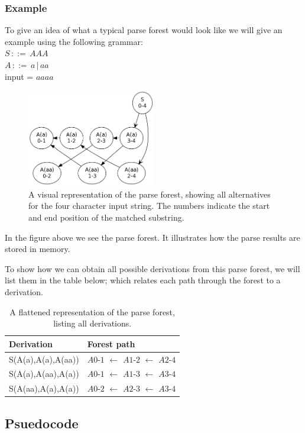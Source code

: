 \documentclass[a4paper,10pt]{article}
\begin{document}
\pagebreak
\subsubsection{Example}
To give an idea of what a typical parse forest would look like we will give an example using the following grammar:\\
$S\,::=\,AAA$\\
$A\,::=\,a\,|\,aa$\\
input = $aaaa$

\begin{figure}[H]
\centering
\includegraphics[width=0.5\textwidth]{a_aa-forest.png}
\caption{A visual representation of the parse forest, showing all alternatives for the four character input string. The numbers indicate the start and end position of the matched substring.}
\end{figure}

In the figure above we see the parse forest. It illustrates how the parse results are stored in memory.

To show how we can obtain all possible derivations from this parse forest, we will list them in the table below; which relates each path through the forest to a derivation.

\begin{table}[H]
\centering
\begin{tabular}{ p{15em} p{15em} }
Derivation & Forest path\\
\hline
S(A(a),A(a),A(aa)) & $A0$-$1$ $\leftarrow$ $A1$-$2$ $\leftarrow$ $A2$-$4$\\
S(A(a),A(aa),A(a)) & $A0$-$1$ $\leftarrow$ $A1$-$3$ $\leftarrow$ $A3$-$4$\\
S(A(aa),A(a),A(a)) & $A0$-$2$ $\leftarrow$ $A2$-$3$ $\leftarrow$ $A3$-$4$
\end{tabular}
\caption{A flattened representation of the parse forest, listing all derivations.}
\end{table}

\subsection{Psuedocode}
\end{document}
